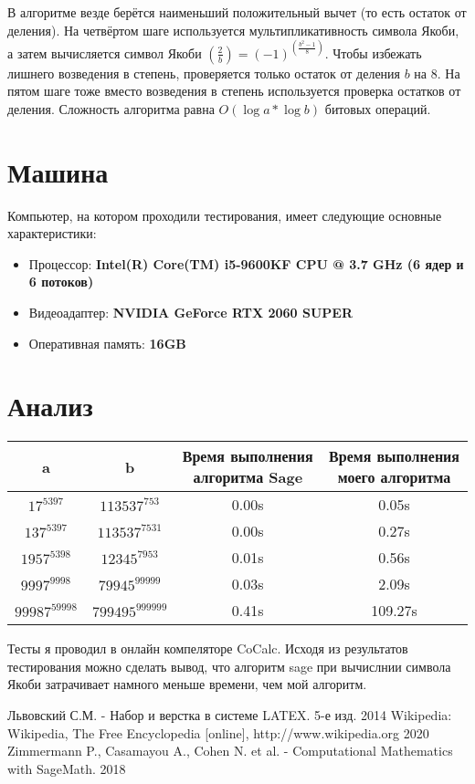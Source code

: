 \documentclass[11pt]{article}
\begin{document}
В алгоритме везде берётся наименьший положительный вычет (то есть остаток от деления).
На четвёртом шаге используется мультипликативность символа Якоби, а затем вычисляется символ Якоби $\left(\frac{2}{b}\right)=(-1)^{\left(\frac{b^2-1}{8}\right)}$. Чтобы избежать лишнего возведения в степень, проверяется только остаток от деления $b$ на 8. На пятом шаге тоже вместо возведения в степень используется проверка остатков от деления. Сложность алгоритма равна $O(\log{a}*\log{b})$ битовых операций.

\section{Машина}
Компьютер, на котором проходили тестирования, имеет следующие основные характеристики:
\begin{itemize}
\item Процессор: \textbf{Intel(R) Core(TM) i5-9600KF CPU @ 3.7 GHz (6 ядер и 6 потоков)}
\item Видеоадаптер: \textbf{NVIDIA GeForce RTX 2060 SUPER}
\item Оперативная память: \textbf{16GB}
\end{itemize}
\section{Анализ}

\begin{tabular}{|c|c|c|c|}
\hline
a & b & Время выполнения алгоритма Sage & Время выполнения моего алгоритма\\
\hline
$17^{5397}$ & $113537^{753}$ & 0.00s & 0.05s\\
$137^{5397}$ & $113537^{7531}$ & 0.00s & 0.27s\\
$1957^{5398}$ & $12345^{7953}$ & 0.01s & 0.56s\\
$9997^{9998}$ & $79945^{99999}$ & 0.03s & 2.09s\\
$99987^{59998}$ & $799495^{999999}$ & 0.41s & 109.27s\\
\hline
\end{tabular}

Тесты я проводил в онлайн компеляторе CoCalc. Исходя из результатов тестирования можно сделать вывод, что алгоритм sage при вычислнии символа Якоби затрачивает намного меньше времени, чем мой алгоритм.

\begin{thebibliography}{3}

	 Львовский С.М. - Набор и верстка в системе LATEX. 5-е изд. 2014
	 Wikipedia: Wikipedia, The Free Encyclopedia [online], http://www.wikipedia.org  2020
	 Zimmermann P., Casamayou A., Cohen N. et al. - Computational Mathematics with SageMath. 2018

\end{thebibliography}
\end{document}
